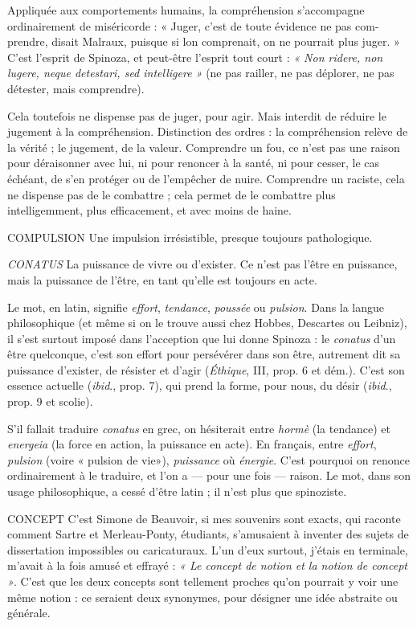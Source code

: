 Appliquée aux comportements humains, la compréhension s'accompagne
ordinairement de miséricorde : « Juger, c’est de toute évidence ne pas com-
prendre, disait Malraux, puisque si lon comprenait, on ne pourrait plus
juger. » C’est l'esprit de Spinoza, et peut-être l'esprit tout court : {\it « Non ridere,
non lugere, neque detestari, sed intelligere »} (ne pas railler, ne pas déplorer, ne pas
détester, mais comprendre).

Cela toutefois ne dispense pas de juger, pour agir. Mais interdit de réduire
le jugement à la compréhension. Distinction des ordres : la compréhension
relève de la vérité ; le jugement, de la valeur. Comprendre un fou, ce n’est pas
une raison pour déraisonner avec lui, ni pour renoncer à la santé, ni pour
cesser, le cas échéant, de s’en protéger ou de l’empêcher de nuire. Comprendre
un raciste, cela ne dispense pas de le combattre ; cela permet de le combattre
plus intelligemment, plus efficacement, et avec moins de haine.

COMPULSION Une impulsion irrésistible, presque toujours pathologique.

{\it CONATUS} La puissance de vivre ou d’exister. Ce n’est pas l’être en puissance,
mais la puissance de l'être, en tant qu’elle est toujours en acte.

Le mot, en latin, signifie {\it effort}, {\it tendance}, {\it poussée} ou {\it pulsion}. Dans la langue
philosophique (et même si on le trouve aussi chez Hobbes, Descartes ou Leibniz),
il s’est surtout imposé dans l’acception que lui donne Spinoza : le {\it conatus}
d’un être quelconque, c’est son effort pour persévérer dans son être, autrement
dit sa puissance d’exister, de résister et d’agir ({\it Éthique}, III, prop. 6 et dém.).
C’est son essence actuelle ({\it ibid}., prop. 7), qui prend la forme, pour nous, du
désir ({\it ibid}., prop. 9 et scolie).

S’il fallait traduire {\it conatus} en grec, on hésiterait entre {\it hormè} (la tendance)
et {\it energeia} (la force en action, la puissance en acte). En français, entre {\it effort},
{\it pulsion} (voire « pulsion de vie»), {\it puissance} où {\it énergie}. C’est pourquoi on
renonce ordinairement à le traduire, et l’on a — pour une fois — raison. Le mot,
dans son usage philosophique, a cessé d’être latin ; il n’est plus que spinoziste.

CONCEPT C'est Simone de Beauvoir, si mes souvenirs sont exacts, qui
raconte comment Sartre et Merleau-Ponty, étudiants, s’amusaient
à inventer des sujets de dissertation impossibles ou caricaturaux. L'un
d'eux surtout, j'étais en terminale, m'avait à la fois amusé et effrayé : {\it « Le
concept de notion et la notion de concept »}. C’est que les deux concepts sont tellement
proches qu’on pourrait y voir une même notion : ce seraient deux synonymes,
pour désigner une idée abstraite ou générale.

